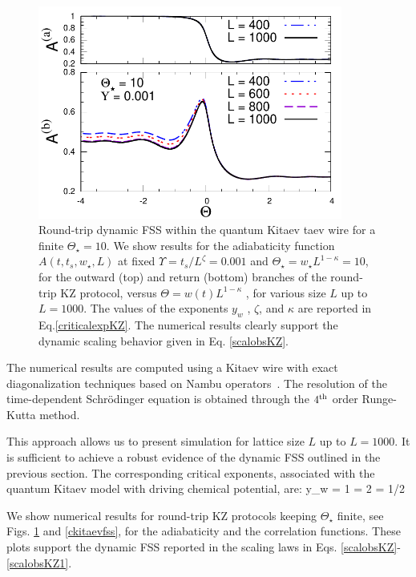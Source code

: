 \begin{figure}[!t]
	\centering
	\includegraphics[width=10cm]{imm/headKITY0001Th10A.pdf}
	\caption{Round-trip dynamic FSS within the quantum Kitaev
	taev wire for a finite $\Theta_\star = 10$. We show results for the adiabaticity
	function $A(t, t_s , w_\star, L)$ at fixed $\Upsilon =t_s /L^\zeta = 0.001$
	and $\Theta_\star = w_\star L^{1-\kappa} = 10$, for the outward (top) and return 
	(bottom) branches of the round-trip KZ protocol, versus
	$\Theta = w(t)L^{1-\kappa}$ , for various size $L$ up to $L = 1000$. The values
	of the exponents $y_w$ , $\zeta$, and $\kappa$ are reported in 
	Eq.\eqref{criticalexpKZ}. The numerical results clearly support the 
	dynamic scaling behavior given in Eq. \eqref{scalobsKZ}.}
	\label{akitaevfss}
\end{figure}


The numerical results are computed using a Kitaev wire with exact diagonalization
techniques based on Nambu operators~\cite{bla86}. The resolution of the time-dependent
Schr\"odinger equation is obtained through the $4^{\rm th}$ order Runge-Kutta method.

This approach allows us to present simulation for lattice size $L$ up to $L=1000$. It is
sufficient to achieve a robust evidence of the dynamic FSS outlined in the previous 
section. The corresponding critical exponents, associated with the quantum Kitaev model
with driving chemical potential, are:
	y_w = 1 \cm \qquad \zeta = 2 \cm \qquad \kappa = 1/2 \pt
\ee

We show numerical results for round-trip KZ protocols keeping $\Theta_\star$ finite, see
Figs. \ref{akitaevfss} and \ref{ckitaevfss}, for the adiabaticity and the correlation
functions. These plots support the dynamic FSS reported in the scaling laws in Eqs.
\eqref{scalobsKZ}-\eqref{scalobsKZ1}.

